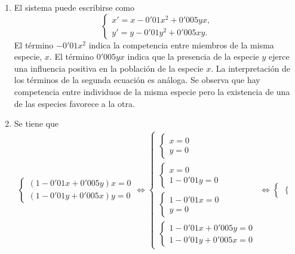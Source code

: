 \documentclass[11pt]{report}
\begin{document}
\begin{solution}
    \hfill
    \begin{enumerate}
        \item El sistema puede escribirse como 
        \[\begin{cases}
            x' = x-0'01x^2+0'005yx, \\
            y' = y-0'01y^2+0'005xy.
        \end{cases}\]
        El término $-0'01x^2$ indica la competencia entre miembros de la misma especie, $x$. El término $0'005yx$ indica que la presencia de la especie $y$ ejerce una influencia positiva en la población de la especie $x$. La interpretación de los términos de la segunda ecuación es análoga. Se observa que hay competencia entre individuos de la misma especie pero la existencia de una de las especies favorece a la otra.
        \item Se tiene que
        \begin{align*}
            \begin{cases}
                (1-0'01x+0'005y)x = 0 \\
                (1-0'01y+0'005x)y = 0 
            \end{cases} \!\iff \begin{cases}
                \begin{cases}
                    x = 0 \\
                    y = 0
                \end{cases} \\[20pt]
                \begin{cases}
                    x = 0 \\
                    1-0'01y = 0
                \end{cases} \\[20pt]
                \begin{cases}
                    1-0'01x = 0 \\
                    y = 0
                \end{cases} \\[20pt]
                \begin{cases}
                    1-0'01x+0'005y = 0 \\
                    1-0'01y+0'005x = 0
                \end{cases}
            \end{cases} \!\iff \begin{cases}
                \begin{cases}

\end{cases}
\end{cases}
\end{align*}
\end{enumerate}
\end{solution}
\end{document}
